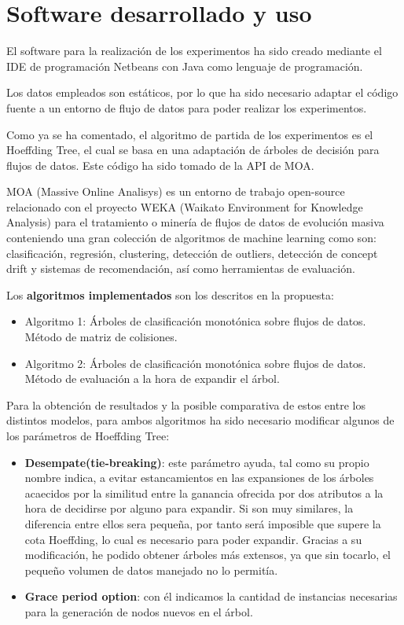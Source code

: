\chapter[Capítulo 5. Software desarrollado y uso]{Software desarrollado y uso}

El software para la realización de los experimentos ha sido creado mediante el IDE de programación Netbeans con Java como lenguaje de programación.

Los datos empleados son estáticos, por lo que ha sido necesario adaptar el código fuente a un entorno de flujo de datos para poder realizar los experimentos.

Como ya se ha comentado, el algoritmo de partida de los experimentos es el Hoeffding Tree, el cual se basa en una adaptación de árboles de decisión para flujos de datos. Este código ha sido tomado de la API de MOA.

MOA (Massive Online Analisys) \cite{ref31} es un entorno de trabajo open-source relacionado con el proyecto WEKA (Waikato Environment for Knowledge Analysis) para el tratamiento o minería de flujos de datos de evolución masiva conteniendo una gran colección de algoritmos de machine
learning como son: clasificación, regresión, clustering, detección de outliers, detección de concept drift y sistemas de recomendación, así como herramientas de evaluación. 

Los \textbf{algoritmos implementados} son los descritos en la propuesta:
\begin{itemize}
	\item Algoritmo 1: Árboles de clasificación monotónica sobre flujos de datos. Método de matriz de colisiones.
	\item Algoritmo 2: Árboles de clasificación monotónica sobre flujos de datos. Método de evaluación a la hora de expandir el árbol.
\end{itemize}

Para la obtención de resultados y la posible comparativa de estos entre los distintos modelos, para ambos algoritmos ha sido necesario modificar algunos de los parámetros de Hoeffding Tree:
\begin{itemize}
	\item \textbf{Desempate(tie-breaking)}: este parámetro ayuda, tal como su propio nombre indica, a evitar estancamientos en las expansiones de los árboles acaecidos por la similitud entre la ganancia ofrecida por dos atributos a la hora de decidirse por alguno para expandir. Si son muy similares, la diferencia entre ellos sera pequeña, por tanto será imposible que supere la cota Hoeffding, lo cual es necesario para poder expandir. Gracias a su modificación, he podido obtener árboles más extensos, ya que sin tocarlo, el pequeño volumen de datos manejado no lo permitía.
	\item \textbf{Grace period option}: con él indicamos la cantidad de instancias necesarias para la generación de nodos nuevos en el árbol.
\end{itemize}

